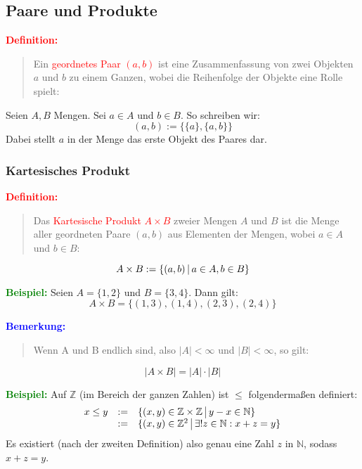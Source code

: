 \documentclass{article}
\newcommand{\smsp}{\phantom{\hspace{3px}}}
\newcommand{\red}[1]{\textcolor{red}{#1}}
\newcommand{\blue}[1]{\textcolor{blue}{#1}}
\newcommand{\green}[1]{\textcolor{green}{#1}}
\newcommand{\ex}{\green{\textbf{Beispiel: }}}
\newcommand{\de}[1]{\red{\textbf{Definition: }}\begin{quote}#1\end{quote}}
\newcommand{\an}[1]{\blue{\textbf{Bemerkung: }}\begin{quote}#1\end{quote}}
\newcommand{\N}{\mathbb{N}}
\newcommand{\Z}{\mathbb{Z}}
\newcommand{\vst}{\smsp \vline \smsp}
\begin{document}
\subsection{Paare und Produkte}

\de{Ein \red{geordnetes Paar $(a, b)$} ist eine Zusammenfassung von zwei Objekten $a$ und $b$ zu einem Ganzen, wobei die Reihenfolge der Objekte eine Rolle spielt:}

\begin{center}
    Seien $A, B$ Mengen. Sei $a \in A$ und $b \in B$. So schreiben wir:
    \begin{equation*}
        (a, b) := \{\{a\}, \{a, b\}\}
    \end{equation*}
    Dabei stellt $a$ in der Menge das erste Objekt des Paares dar.
\end{center}

\subsubsection{Kartesisches Produkt}
\de{Das \red{Kartesische Produkt $A \times B$} zweier Mengen $A$ und $B$ ist die Menge aller geordneten Paare $(a, b)$ aus Elementen der Mengen, wobei $a \in A$ und $b \in B$:}
\begin{equation*}
    A \times B := \{(a, b) \vst a \in A, b \in B\}
\end{equation*}

\ex Seien $A = \{1, 2\}$ und $B = \{3, 4\}$. Dann gilt:
\begin{equation*}
    A \times B = \{(1, 3), (1, 4), (2, 3), (2, 4)\}
\end{equation*}

\newpage
\an{Wenn A und B endlich sind, also $|A| < \infty$ und $|B| < \infty$, so gilt:}
\begin{equation*}
    |A \times B| = |A| \cdot |B|
\end{equation*}

\ex Auf $\Z$ (im Bereich der ganzen Zahlen) ist $\leq$ folgendermaßen definiert:
\begin{equation*}
    \begin{array}{lcl}
        x \leq y & := & \{(x, y) \in \Z \times \Z \vst y - x \in \N\}\\
                 & := & \{(x, y) \in \Z^2 \vst \exists! z \in \N: x + z = y\}
    \end{array}
\end{equation*}
Es existiert (nach der zweiten Definition) also genau eine Zahl $z$ in $\N$, sodass $x + z = y$.
\end{document}
